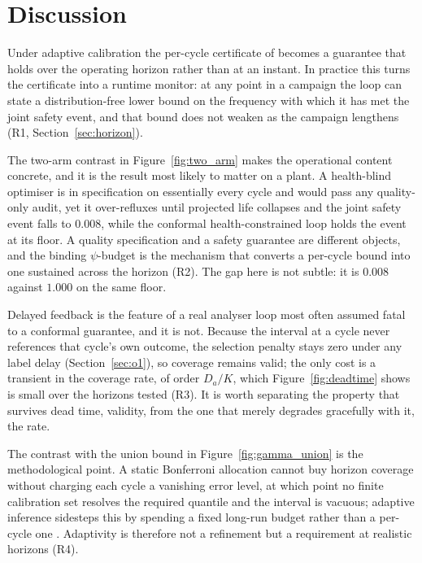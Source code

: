 \section{Discussion}
\label{sec:discussion}

Under adaptive calibration the per-cycle certificate of \citet{busico_m4} becomes a guarantee
that holds over the operating horizon rather than at an instant. In practice this turns the
certificate into a runtime monitor: at any point in a campaign the loop can state a
distribution-free lower bound on the frequency with which it has met the joint safety event,
and that bound does not weaken as the campaign lengthens (R1, Section~\ref{sec:horizon}).

The two-arm contrast in Figure~\ref{fig:two_arm} makes the operational content concrete, and it
is the result most likely to matter on a plant. A health-blind optimiser is in specification on
essentially every cycle and would pass any quality-only audit, yet it over-refluxes until
projected life collapses and the joint safety event falls to $0.008$, while the conformal
health-constrained loop holds the event at its floor. A quality specification and a safety
guarantee are different objects, and the binding $\psi$-budget is the mechanism that converts a
per-cycle bound into one sustained across the horizon (R2). The gap here is not subtle: it is
$0.008$ against $1.000$ on the same floor.

Delayed feedback is the feature of a real analyser loop most often assumed fatal to a conformal
guarantee, and it is not. Because the interval at a cycle never references that cycle's own
outcome, the selection penalty stays zero under any label delay (Section~\ref{sec:o1}), so
coverage remains valid; the only cost is a transient in the coverage rate, of order $D_a/K$,
which Figure~\ref{fig:deadtime} shows is small over the horizons tested (R3). It is worth
separating the property that survives dead time, validity, from the one that merely degrades
gracefully with it, the rate.

The contrast with the union bound in Figure~\ref{fig:gamma_union} is the methodological point. A
static Bonferroni allocation cannot buy horizon coverage without charging each cycle a vanishing
error level, at which point no finite calibration set resolves the required quantile and the
interval is vacuous; adaptive inference sidesteps this by spending a fixed long-run budget
rather than a per-cycle one \citep{gibbs2021}. Adaptivity is therefore not a refinement but a
requirement at realistic horizons (R4).

